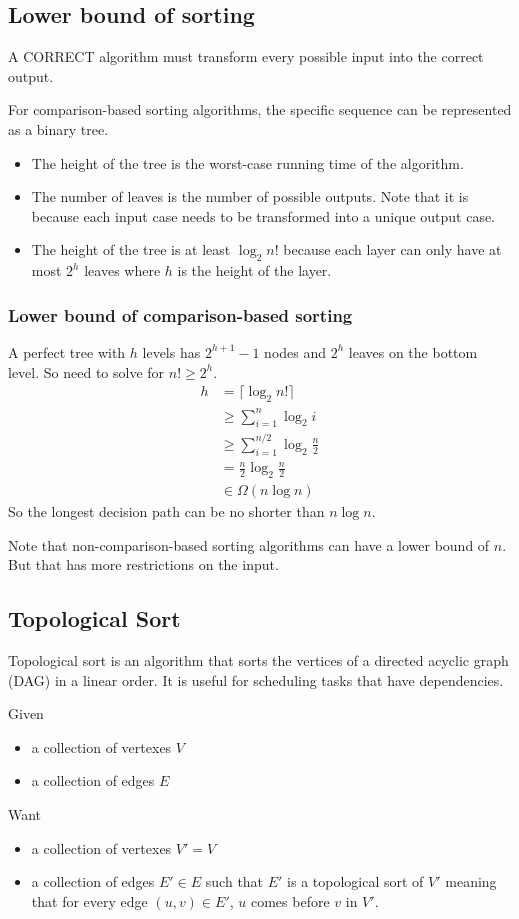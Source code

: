 \documentclass[letterpaper,12pt]{article}
\begin{document}
\subsection{Lower bound of sorting}
A CORRECT algorithm must transform every possible input into the correct output. 

For comparison-based sorting algorithms, the specific sequence can be represented as a binary tree. \begin{itemize}
    \item The height of the tree is the worst-case running time of the algorithm.
    \item The number of leaves is the number of possible outputs. Note that it is because each input case needs to be transformed into a unique output case. 
    \item The height of the tree is at least $\log_2 n!$ because each layer can only have at most $2^h$ leaves where $h$ is the height of the layer.
\end{itemize}
\subsubsection{Lower bound of comparison-based sorting}
A perfect tree with $h$ levels has $2^{h+1}-1$ nodes and $2^h$ leaves on the bottom level. So need to solve for $n! \geq 2^h$.
\begin{align*}
    h &= \lceil \log_2 n! \rceil \\
    &\geq \sum_{i=1}^{n} \log_2 i \\
    &\geq \sum_{i=1}^{n/2} \log_2 \frac{n}{2} \\
    &= \frac{n}{2}\log_2 \frac{n}{2} \\
    &\in \Omega(n\log n)
\end{align*}
So the longest decision path can be no shorter than $n\log n$.

Note that non-comparison-based sorting algorithms can have a lower bound of $n$. But that has more restrictions on the input.
\subsection{Topological Sort}
Topological sort is an algorithm that sorts the vertices of a directed acyclic graph (DAG) in a linear order. It is useful for scheduling tasks that have dependencies.

Given \begin{itemize}
    \item a collection of vertexes $V$
    \item a collection of edges $E$
\end{itemize}
Want \begin{itemize}
    \item a collection of vertexes $V'= V$
    \item a collection of edges $E' \in E$ such that $E'$ is a topological sort of $V'$ meaning that for every edge $(u,v) \in E'$, $u$ comes before $v$ in $V'$.
\end{itemize}
\end{document}
